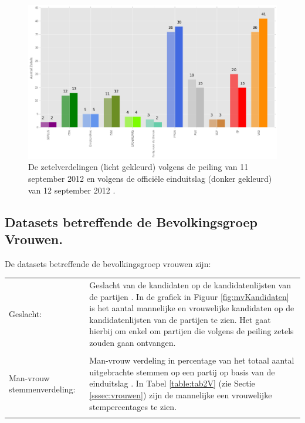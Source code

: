 \begin{figure}[H]
\centering
	\includegraphics[width=\linewidth]{peiling_zetels_landelijk.png}

			\caption{De zetelverdelingen (licht gekleurd) volgens de peiling van 11 september 2012 \citep{IPSOS} en volgens de offici\"{e}le einduitslag (donker gekleurd) van 12 september 2012 \citep{Kiesraad_databank}.}

\label{fig:pzL}
\end{figure}











\subsection{Datasets betreffende de Bevolkingsgroep Vrouwen.}
De datasets betreffende de bevolkingsgroep vrouwen zijn:\\




\noindent\begin{tabularx}{\textwidth}{LI}
Geslacht: & Geslacht van de kandidaten op de kandidatenlijsten van de partijen \cite{Kiesraad_kandidatenlijsten}. In de grafiek in Figuur \ref{fig:mvKandidaten} is het aantal mannelijke en vrouwelijke kandidaten op de kandidatenlijsten van de partijen te zien. Het gaat hierbij om enkel om partijen die volgens de peiling zetels zouden gaan ontvangen.\\
\\
Man-vrouw stemmenverdeling: & Man-vrouw verdeling in percentage van het totaal aantal uitgebrachte stemmen op een partij op basis van de einduitslag \citep{IPSOS}. In Tabel \ref{table:tab2V} (zie Sectie \ref{sssec:vrouwen}) zijn de mannelijke een vrouwelijke stempercentages te zien. \\
\\  
\end{tabularx}

